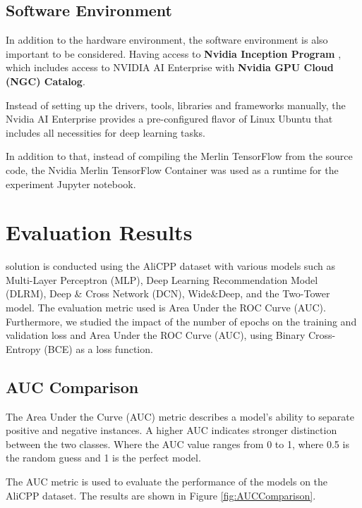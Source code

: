 \subsection{Software Environment}

In addition to the hardware environment, the software environment is also important to be considered.
Having access to \textbf{Nvidia Inception Program} \cite{NvidiaStartups}, 
which includes access to NVIDIA AI Enterprise \cite{NvidiaAiEnterprise} with \textbf{Nvidia GPU Cloud (NGC) Catalog}\cite{NvidiaNGC}.

Instead of setting up the drivers, tools, libraries and frameworks manually, 
the Nvidia AI Enterprise provides a pre-configured flavor of Linux Ubuntu that includes all necessities for deep learning tasks.

In addition to that, instead of compiling the Merlin TensorFlow from the source code, 
the Nvidia Merlin TensorFlow Container \cite{NvidiaMerlinTf} was used as a runtime for the experiment Jupyter notebook.


\section{Evaluation Results}
solution is conducted using the AliCPP dataset with various models such as Multi-Layer Perceptron (MLP), Deep Learning Recommendation Model (DLRM), Deep \& Cross Network (DCN), Wide\&Deep, and the Two-Tower model. The evaluation metric used is Area Under the ROC Curve (AUC). Furthermore, we studied the impact of the number of epochs on the training and validation loss and Area Under the ROC Curve (AUC), using Binary Cross-Entropy (BCE) as a loss function.
\subsection{AUC Comparison}

The Area Under the Curve (AUC) metric describes a model's ability to separate positive and negative instances. A higher AUC indicates stronger distinction between the two classes. Where the AUC value ranges from 0 to 1, where 0.5 is the random guess and 1 is the perfect model.

The AUC metric is used to evaluate the performance of the models on the AliCPP dataset. The results are shown in Figure \ref{fig:AUCComparison}.

